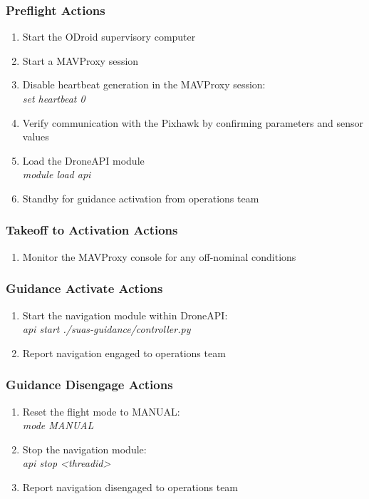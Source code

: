 \documentclass{aiaa}
\begin{document}
\subsubsection{Preflight Actions}
\begin{enumerate}
	\item Start the ODroid supervisory computer
	\item Start a MAVProxy session
	\item Disable heartbeat generation in the MAVProxy session: \\
	\textit{set heartbeat 0}
	\item Verify communication with the Pixhawk by confirming parameters and sensor values
	\item Load the DroneAPI module \\
	\textit{module load api}
	\item Standby for guidance activation from operations team
\end{enumerate}
\subsubsection{Takeoff to Activation Actions}
\begin{enumerate}
	\item Monitor the MAVProxy console for any off-nominal conditions
\end{enumerate}
\subsubsection{Guidance Activate Actions}
\begin{enumerate}
	\item Start the navigation module within DroneAPI: \\
	\textit{api start ./suas-guidance/controller.py}
	\item Report navigation engaged to operations team
\end{enumerate}
\subsubsection{Guidance Disengage Actions}
\begin{enumerate}
	\item Reset the flight mode to MANUAL: \\
	\textit{mode MANUAL}
	\item Stop the navigation module: \\
	\textit{api stop \textless threadid\textgreater}
	\item Report navigation disengaged to operations team
\end{enumerate}
\end{document}
